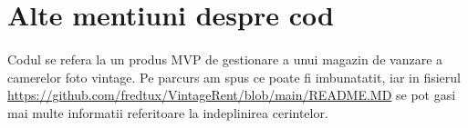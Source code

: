 \documentclass[oneside]{article}
\begin{document}
\section[Alte mentiuni despre cod]{Alte mentiuni despre cod}
\paragraph{} Codul se refera la un produs MVP de gestionare a unui magazin de vanzare a camerelor foto vintage. Pe parcurs am spus ce poate fi imbunatatit, iar in fisierul {\color{blue}\url{https://github.com/fredtux/VintageRent/blob/main/README.MD}} se pot gasi mai multe informatii referitoare la indeplinirea cerintelor.
\end{document}
